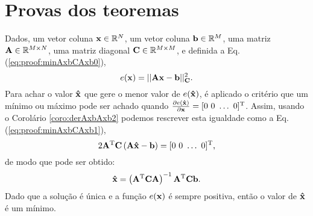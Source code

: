 \section{Provas dos teoremas}
 
\begin{myproofT}\label{proof:theo:minAxbCAxb}
Dados,
um vetor coluna $\VECTOR{x}\in \mathbb{R}^N$, 
um vetor coluna $\VECTOR{b}\in \mathbb{R}^M$,  
uma matriz $\MATRIX{A} \in \mathbb{R}^{M\times N}$, 
uma matriz diagonal $\MATRIX{C} \in \mathbb{R}^{M\times M}$, e 
definida a Eq. (\ref{eq:proof:minAxbCAxb0}),
\begin{equation}\label{eq:proof:minAxbCAxb0}
e(\VECTOR{x})=||\MATRIX{A}\VECTOR{x}-\VECTOR{b}||_{\MATRIX{C}}^2.
\end{equation}
Para achar o valor  $\VECTOR{\hat{x}}$ que gere o menor valor de $e(\VECTOR{\hat{x}})$, é aplicado
o critério que um mínimo ou máximo pode ser achado quando 
$\frac{\partial e(\VECTOR{\hat{x}})}{\partial \VECTOR{x} }=[0~ 0~ \hdots~ 0 ]^{\transpose}$.
Assim, usando o Corolário \ref{coro:derAxbAxb2} podemos 
rescrever esta igualdade como a Eq. (\ref{eq:proof:minAxbCAxb1}),
\begin{equation}\label{eq:proof:minAxbCAxb1}
2 \MATRIX{A}^{\transpose}\MATRIX{C}\left(\MATRIX{A}\VECTOR{\hat{x}}-\VECTOR{b}\right)=[0~ 0~ \hdots~ 0 ]^{\transpose},
\end{equation}
de modo que pode ser obtido:
\begin{equation}\label{eq:proof:minAxbCAxb2}
\VECTOR{\hat{x}}=\left( \MATRIX{A}^{\transpose}\MATRIX{C}\MATRIX{A} \right)^{-1} \MATRIX{A}^{\transpose}\MATRIX{C} \VECTOR{b}.
\end{equation}
Dado que a solução é única e a função $e(\VECTOR{x})$ é sempre positiva, então
o valor de $\VECTOR{\hat{x}}$ é um mínimo.
\end{myproofT}

